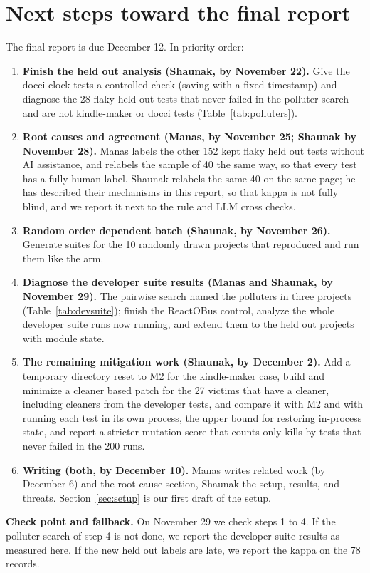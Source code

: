 \documentclass[sigconf,nonacm]{acmart}
\begin{document}
\section{Next steps toward the final report}
\label{sec:next3}
The final report is due December 12. In priority order:
\begin{enumerate}
\item \textbf{Finish the held out analysis (Shaunak, by November 22).} Give the docci clock tests a controlled check (saving with a fixed timestamp) and diagnose the 28 flaky held out tests that never failed in the polluter search and are not kindle-maker or docci tests (Table~\ref{tab:polluters}).
\item \textbf{Root causes and agreement (Manas, by November 25; Shaunak by November 28).} Manas labels the other 152 kept flaky held out tests without AI assistance, and relabels the sample of 40 the same way, so that every test has a fully human label. Shaunak relabels the same 40 on the same page; he has described their mechanisms in this report, so that kappa is not fully blind, and we report it next to the rule and LLM cross checks.
\item \textbf{Random order dependent batch (Shaunak, by November 26).} Generate suites for the 10 randomly drawn projects that reproduced and run them like the arm.
\item \textbf{Diagnose the developer suite results (Manas and Shaunak, by November 29).} The pairwise search named the polluters in three projects (Table~\ref{tab:devsuite}); finish the ReactOBus control, analyze the whole developer suite runs now running, and extend them to the held out projects with module state.
\item \textbf{The remaining mitigation work (Shaunak, by December 2).} Add a temporary directory reset to M2 for the kindle-maker case, build and minimize a cleaner based patch for the 27 victims that have a cleaner, including cleaners from the developer tests, and compare it with M2 and with running each test in its own process, the upper bound for restoring in-process state, and report a stricter mutation score that counts only kills by tests that never failed in the 200 runs.
\item \textbf{Writing (both, by December 10).} Manas writes related work (by December 6) and the root cause section, Shaunak the setup, results, and threats. Section~\ref{sec:setup} is our first draft of the setup.
\end{enumerate}
\textbf{Check point and fallback.} On November 29 we check steps 1 to 4. If the polluter search of step 4 is not done, we report the developer suite results as measured here. If the new held out labels are late, we report the kappa on the 78 records.
\end{document}
